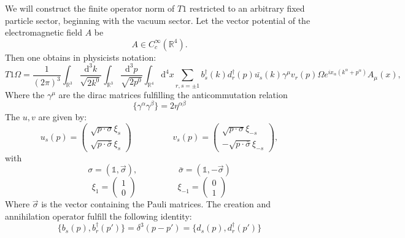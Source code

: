 \documentclass[a4paper,12pt]{article}
\begin{document}
We will construct the finite operator norm of \(T1\) restricted to an arbitrary fixed particle sector, beginning with the vacuum sector. Let the vector potential of the electromagnetic field \(A\) be
\begin{equation}
A\in C^\infty_c\left(\mathbb{R}^4\right).
\end{equation}
%
%
Then one obtains in physicists notation:
\begin{equation}
T1 \Omega = \frac{1}{(2\pi)^3}  \int_{\mathbb{R}^3} \frac{\text{d}^3k}{\sqrt{2 k^0}} \int_{\mathbb{R}^3} \frac{\text{d}^3p}{\sqrt{2 p^0}} \int_{\mathbb{R}^4}\text{d}^4x\sum_{r,s = \pm1} b^\dagger_s (k) d^\dagger_r (p) \bar{u_s}(k) \gamma^\mu v_r (p) \Omega e^{i x_\alpha (k^\alpha + p^\alpha)} A_{\mu} (x),
\end{equation}
Where the \(\gamma^\mu\) are the dirac matrices fulfilling the anticommutation relation 
\begin{equation}
\{\gamma^\alpha \gamma^\beta \} = 2 \eta^{\alpha \beta}
\end{equation}
The \(u , v\) are given by:
\begin{equation}
u_s(p)=\begin{pmatrix}
\sqrt{p \cdot \sigma} \xi_s \\ \sqrt{p \cdot \bar{\sigma}} \xi_s
\end{pmatrix} 
\hspace{2cm}
v_s(p)=\begin{pmatrix}
\sqrt{p \cdot \sigma} \xi_{-s} \\ -\sqrt{p \cdot \bar{\sigma}} \xi_{-s}
\end{pmatrix} ,
\end{equation}
with 
\begin{equation}
\sigma=(\mathds{1} , \vec{\sigma}) , \hspace{2cm} \bar{\sigma}=(\mathds{1} , -\vec{\sigma}) 
\end{equation}
\begin{equation}
\xi_1=\begin{pmatrix}
1\\0
\end{pmatrix}
\hspace{2cm}
\xi_{-1}=\begin{pmatrix}
0\\1
\end{pmatrix}
\end{equation}
Where \(\vec{\sigma}\) is the vector containing the Pauli matrices. The creation and annihilation operator fulfill the following identity:
\begin{equation}
\{ b_s(p),b^\dagger_r (p')\}=\delta^3(p-p')=\{ d_s(p),d^\dagger_r (p')\}
\end{equation}
\end{document}
